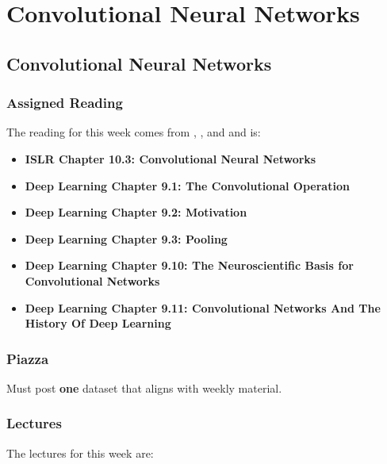 \clearpage

\renewcommand{\ChapTitle}{Convolutional Neural Networks}
\renewcommand{\SectionTitle}{Convolutional Neural Networks}

\chapter{\ChapTitle}
\section{\SectionTitle}

\subsection{Assigned Reading}

The reading for this week comes from \ISLRPython, \ISLRR, and \ESLII \hspace*{1pt} and is:

\begin{itemize}
    \item \textbf{ISLR Chapter 10.3: Convolutional Neural Networks}
    \item \textbf{Deep Learning Chapter 9.1: The Convolutional Operation}
    \item \textbf{Deep Learning Chapter 9.2: Motivation}
    \item \textbf{Deep Learning Chapter 9.3: Pooling}
    \item \textbf{Deep Learning Chapter 9.10: The Neuroscientific Basis for Convolutional Networks}
    \item \textbf{Deep Learning Chapter 9.11: Convolutional Networks And The History Of Deep Learning}
\end{itemize}

\subsection{Piazza}

Must post \textbf{one} dataset that aligns with weekly material.

\subsection{Lectures}

The lectures for this week are:

